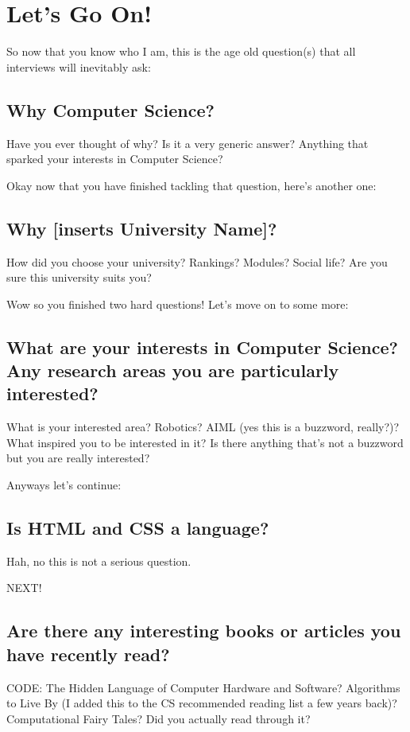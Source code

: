 \documentclass[12pt]{article}
\begin{document}
\section{Let's Go On!}

So now that you know who I am, this is the age old question(s) that all interviews will inevitably ask:

\subsection{Why Computer Science?}
Have you ever thought of why? Is it a very generic answer? Anything that sparked your interests in Computer Science?

Okay now that you have finished tackling that question, here's another one:

\subsection{Why [inserts University Name]?}
How did you choose your university? Rankings? Modules? Social life? Are you sure this university suits you?

Wow so you finished two hard questions! Let's move on to some more:

\subsection{What are your interests in Computer Science? Any research areas you are particularly interested?}
What is your interested area? Robotics? AIML (yes this is a buzzword, really?)? What inspired you to be interested in it? Is there anything that's not a buzzword but you are really interested? 

Anyways let's continue:

\subsection{Is HTML and CSS a language?}
Hah, no this is not a serious question.

NEXT!

\subsection{Are there any interesting books or articles you have recently read?}
CODE: The Hidden Language of Computer Hardware and Software? Algorithms to Live By (I added this to the CS recommended reading list a few years back)? Computational Fairy Tales? Did you actually read through it?
\end{document}
